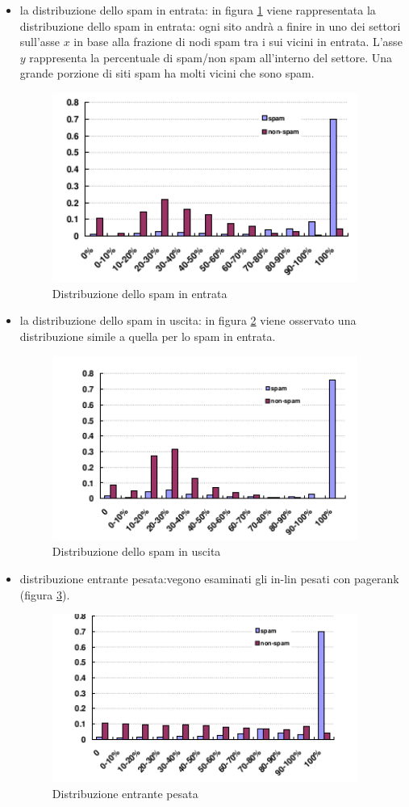 \begin{itemize}
 \item la distribuzione dello spam in entrata:  in figura \ref{img:gan1} viene rappresentata la distribuzione dello spam in entrata: ogni sito andrà a finire in uno dei settori sull'asse \(x\) in base alla frazione di nodi spam tra i sui vicini in entrata. L'asse \(y\) rappresenta la percentuale di spam/non spam all'interno del settore. Una grande porzione di siti spam ha molti vicini che sono spam. 
 \begin{figure}
 \centering
\includegraphics[width=10cm]{immagini/gan/immagine1.png}
\caption{Distribuzione dello spam in entrata}
\label{img:gan1}
\end{figure}
\item la distribuzione dello spam in uscita: in figura \ref{img:gan2} viene osservato una distribuzione simile a quella per lo spam in entrata.
 \begin{figure}
 \centering
\includegraphics[width=10cm]{immagini/gan/immagine2.png}
\caption{Distribuzione dello spam in uscita}
\label{img:gan2}
\end{figure}
\item distribuzione entrante pesata:vegono esaminati gli in-lin  pesati con pagerank (figura \ref{img:gan3}).
 \begin{figure}
 \centering
\includegraphics[width=10cm]{immagini/gan/immagine3.png}
\caption{Distribuzione entrante pesata}
\label{img:gan3}
\end{figure}
\end{itemize}
